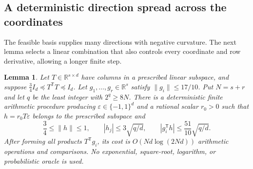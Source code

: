 \documentclass[11pt]{amsart}
\newtheorem{lemma}[theorem]{Lemma}
\theoremstyle{definition}\newtheorem{definition}[theorem]{Definition}
\theoremstyle{remark}\newtheorem{remark}[theorem]{Remark}
\numberwithin{equation}{section}
\begin{document}
\subsection{A deterministic direction spread across the coordinates}\label{b:sec:flat}
The feasible basis supplies many directions with negative curvature.
The next lemma selects a linear combination that also controls every
coordinate and row derivative, allowing a longer finite step.

\begin{lemma}\label{b:lem:deterministic-flat}
Let $T\in\mathbb R^{s\times d}$ have columns in a prescribed linear
subspace, and suppose
$\frac34 I_d\preceq T^{\mathsf T}T\preceq I_d$.
Let $g_1,\ldots,g_r\in\mathbb R^s$ satisfy $\|g_i\|\le17/10$.
Put $N=s+r$ and let $q$ be the least integer with $2^q\ge8N$.
There is a deterministic finite arithmetic procedure producing
$\varepsilon\in\{-1,1\}^d$ and a rational scalar $r_0>0$ such that
$h=r_0T\varepsilon$ belongs to the prescribed subspace and
\[
 \frac34\le\|h\|\le1,\qquad
 |h_j|\le3\sqrt{q/d},\qquad
 |g_i^{\mathsf T}h|\le\frac{51}{10}\sqrt{q/d}.
\]
After forming all products $T^{\mathsf T}g_i$, its cost is
$O(Nd\log(2Nd))$ arithmetic operations and comparisons.  No exponential,
square-root, logarithm, or probabilistic oracle is used.
\end{lemma}
\end{document}
